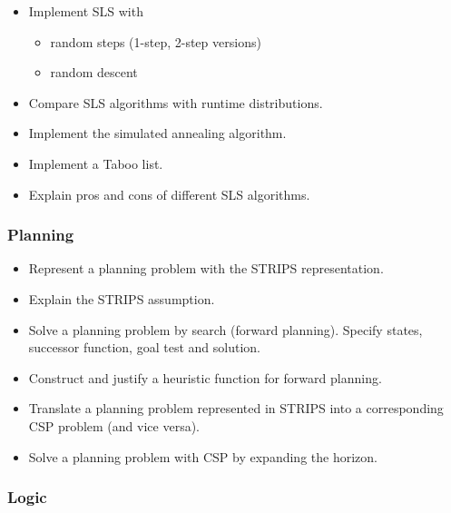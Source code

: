 \documentclass{article}
\begin{document}
\begin{itemize}
    \item Implement SLS with
        \begin{itemize}
            \item random steps (1-step, 2-step versions)
            \item random descent
        \end{itemize}
    \item Compare SLS algorithms with runtime distributions.
    \item Implement the simulated annealing algorithm.
    \item Implement a Taboo list.
    \item Explain pros and cons of different SLS algorithms.
\end{itemize}

\subsubsection*{Planning}

\begin{itemize}
    \item Represent a planning problem with the STRIPS representation.
    \item Explain the STRIPS assumption.
    \item Solve a planning problem by search (forward planning). Specify states, successor function, goal test and solution.
    \item Construct and justify a heuristic function for forward planning.
    \item Translate a planning problem represented in STRIPS into a corresponding CSP problem (and vice versa).
    \item Solve a planning problem with CSP by expanding the horizon.
\end{itemize}

\subsubsection*{Logic}
\end{document}
